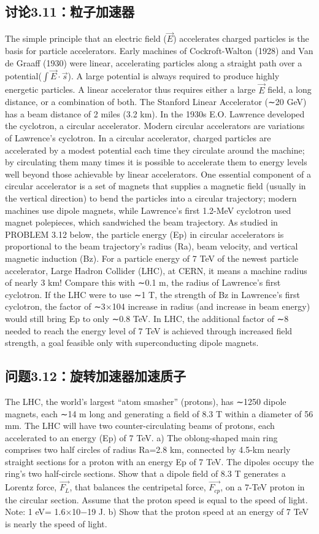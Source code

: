 \subsection{讨论3.11：粒子加速器}
The simple principle that an electric field ($\vec{E}$) accelerates charged particles is the
basis for particle accelerators. Early machines of Cockroft-Walton (1928) and Van
de Graaff (1930) were linear, accelerating particles along a straight path over a
potential($\int\vec{E}\cdot\vec{s}$). A large potential is always required to produce highly energetic
particles. A linear accelerator thus requires either a large $\vec{E}$ field, a long distance,
or a combination of both. The Stanford Linear Accelerator (∼20 GeV) has a beam
distance of 2 miles (3.2 km).
In the 1930s E.O. Lawrence developed the cyclotron, a circular accelerator. Modern circular accelerators are variations of Lawrence’s cyclotron. In a circular accelerator, charged particles are accelerated by a modest potential each time they
circulate around the machine; by circulating them many times it is possible to accelerate them to energy levels well beyond those achievable by linear accelerators.
One essential component of a circular accelerator is a set of magnets that supplies
a magnetic field (usually in the vertical direction) to bend the particles into a
circular trajectory; modern machines use dipole magnets, while Lawrence’s first
1.2-MeV cyclotron used magnet polepieces, which sandwiched the beam trajectory.
As studied in PROBLEM 3.12 below, the particle energy (Ep) in circular accelerators is proportional to the beam trajectory’s radius (Ra), beam velocity, and
vertical magnetic induction (Bz). For a particle energy of 7 TeV of the newest
particle accelerator, Large Hadron Collider (LHC), at CERN, it means a machine
radius of nearly 3 km! Compare this with ∼0.1 m, the radius of Lawrence’s first
cyclotron. If the LHC were to use ∼1 T, the strength of Bz in Lawrence’s first
cyclotron, the factor of ∼3×104 increase in radius (and increase in beam energy)
would still bring Ep to only ∼0.8 TeV. In LHC, the additional factor of ∼8 needed
to reach the energy level of 7 TeV is achieved through increased field strength, a
goal feasible only with superconducting dipole magnets.
\newpage


\subsection{问题3.12：旋转加速器加速质子}
The LHC, the world’s largest “atom smasher” (protons), has ∼1250 dipole magnets, each ∼14 m long and generating a field of 8.3 T within a diameter of 56 mm.
The LHC will have two counter-circulating beams of protons, each accelerated to
an energy (Ep) of 7 TeV.
a) The oblong-shaped main ring comprises two half circles of radius Ra=2.8 km,
connected by 4.5-km nearly straight sections for a proton with an energy
Ep
of 7 TeV. The dipoles occupy the ring’s two half-circle sections. Show
that a dipole field of 8.3 T generates a Lorentz force, $\vec{F_L}$, that balances the
centripetal force, $\vec{F_{cp}}$, on a 7-TeV proton in the circular section. Assume that
the proton speed is equal to the speed of light. Note: 1 eV= 1.6×10−19 J.
b) Show that the proton speed at an energy of 7 TeV is nearly the speed of light.

